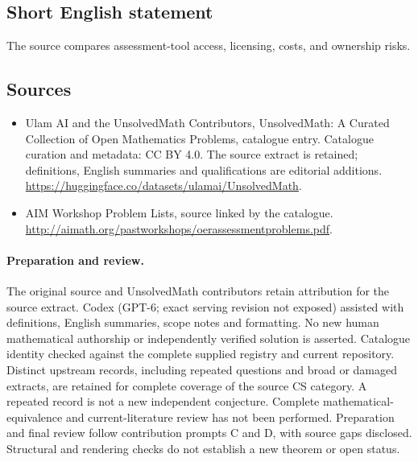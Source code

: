 \documentclass[11pt]{article}
\begin{document}
\subsection{Short English statement}
The source compares assessment-tool access, licensing, costs, and ownership risks.
\subsection{Sources}
\begin{itemize}
\item[\hypertarget{source:statement:1}{S1}] Ulam AI and the UnsolvedMath Contributors, UnsolvedMath: A Curated Collection of Open Mathematics Problems, catalogue entry. Catalogue curation and metadata: CC BY 4.0. The source extract is retained; definitions, English summaries and qualifications are editorial additions.
\url{https://huggingface.co/datasets/ulamai/UnsolvedMath}.
\item[\hypertarget{source:statement:2}{S2}] AIM Workshop Problem Lists, source linked by the catalogue.
\url{http://aimath.org/pastworkshops/oerassessmentproblems.pdf}.
\end{itemize}
\paragraph{Preparation and review.}
The original source and UnsolvedMath contributors retain attribution for the source extract. Codex (GPT-6; exact serving revision not exposed) assisted with definitions, English summaries, scope notes and formatting. No new human mathematical authorship or independently verified solution is asserted. Catalogue identity checked against the complete supplied registry and current repository. Distinct upstream records, including repeated questions and broad or damaged extracts, are retained for complete coverage of the source CS category. A repeated record is not a new independent conjecture. Complete mathematical-equivalence and current-literature review has not been performed. Preparation and final review follow contribution prompts C and D, with source gaps disclosed. Structural and rendering checks do not establish a new theorem or open status.
\label{end:statement}
\end{document}
